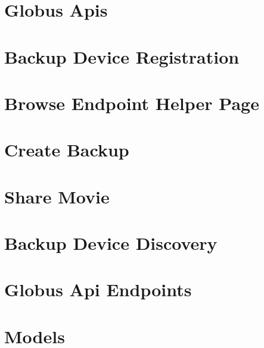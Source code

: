 \chapter{Globus Apis\label{appendix:globusapis}}

\chapter{Backup Device Registration\label{appendix:backupdeviceregistration}}

\chapter{Browse Endpoint Helper Page\label{appendix:browseendpointhelperpage}}

\chapter{Create Backup\label{appendix:createbackup}}

\chapter{Share Movie\label{appendix:sharemovie}}

\chapter{Backup Device Discovery\label{appendix:backupdevicediscovery}}

\chapter{Globus Api Endpoints\label{appendix:globusapiendpoints}}

\chapter{Models\label{appendix:models}}

